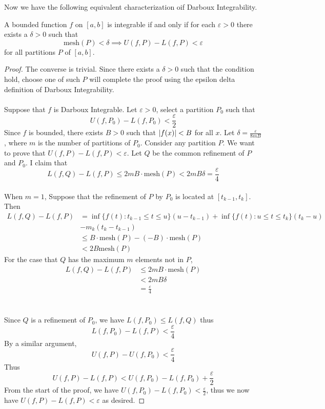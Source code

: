 \documentclass[a4paper]{article}
\begin{document}
Now we have the following equivalent characterization oif Darboux Integrability. 

\begin{thm}{}{} A bounded function $f$ on $[a,b]$ is integrable if and only if for each $\varepsilon>0$ there exists a $\delta>0$ such that $$\text{mesh}(P)<\delta\implies U(f,P)-L(f,P)<\varepsilon$$ for all partitions $P$ of $[a,b]$. \tcbline
\begin{proof} The converse is trivial. Since there exists a $\delta>0$ such that the condition hold, choose one of such $P$ will complete the proof using the epsilon delta definition of Darboux Integrability. \\~\\
Suppose that $f$ is Darboux Integrable. Let $\varepsilon>0$, select a partition $P_0$ such that $$U(f,P_0)-L(f,P_0)<\frac{\varepsilon}{2}$$ Since $f$ is bounded, there exists $B>0$ such that $\abs{f(x)}<B$ for all $x$. Let $\delta
=\frac{\varepsilon}{8mB}$, where $m$ is the number of partitions of $P_0$. Consider any partition $P$. We want to prove that $U(f,P)-L(f,P)<\varepsilon$. Let $Q$ be the common refinement of $P$ and $P_0$. I claim that $$L(f,Q)-L(f,P)\leq 2mB\cdot\text{mesh}(P)<2mB\delta=\frac{\varepsilon}{4}$$\\
When $m=1$, Suppose that the refinement of $P$ by $P_0$ is located at $[t_{k-1},t_k]$. Then 
\begin{align*}
L(f,Q)-L(f,P)&=\inf\{f(t):t_{k-1}\leq t\leq u\}(u-t_{k-1})+\inf\{f(t):u\leq t\leq t_k\}(t_k-u)\\
&-m_k(t_k-t_{k-1})\\
&\leq B\cdot\text{mesh}(P)-(-B)\cdot\text{mesh}(P)\tag{$-B$ is a minimum of $f(x)$}\\
&<2B\text{mesh}(P)
\end{align*}
For the case that $Q$ has the maximum $m$ elements not in $P$, 
\begin{align*}
L(f,Q)-L(f,P)&\leq 2mB\cdot\text{mesh}(P)\tag{Same argument as the case for $m=1$}\\
&<2mB\delta\\
&=\frac{\varepsilon}{4}\tag{constructed $\delta$}
\end{align*}
\\~\\
Since $Q$ is a refinement of $P_0$, we have $L(f,P_0)\leq L(f,Q)$ thus $$L(f,P_0)-L(f,P)<\frac{\varepsilon}{4}$$ By a similar argument, $$U(f,P)-U(f,P_0)<\frac{\varepsilon}{4}$$
Thus $$U(f,P)-L(f,P)<U(f,P_0)-L(f,P_0)+\frac{\varepsilon}{2}$$ From the start of the proof, we have $U(f,P_0)-L(f,P_0)<\frac{\varepsilon}{2}$, thus we now have $U(f,P)-L(f,P)<\varepsilon$ as desired. 
\end{proof}
\end{thm}
\end{document}
